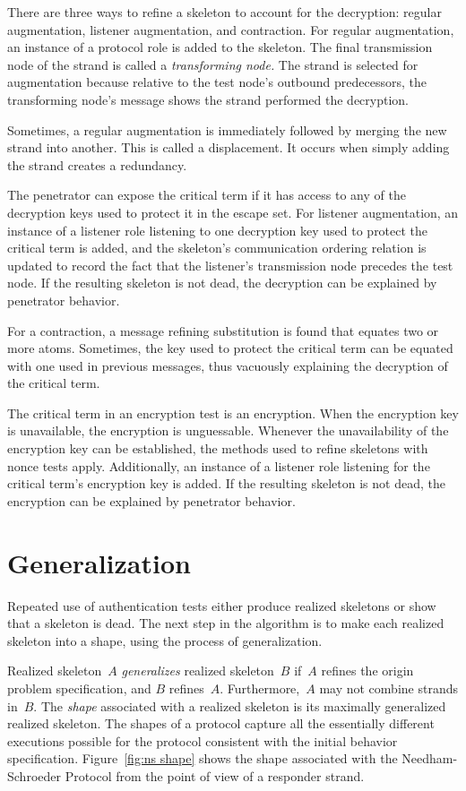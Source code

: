 \documentclass[12pt]{article}
\begin{document}
There are three ways to refine a skeleton to account for the
decryption: regular augmentation, listener augmentation, and
contraction.  For regular augmentation, an instance of a protocol role
is added to the skeleton.  The final transmission node of the strand
is called a \emph{transforming node.}  The strand is selected for
augmentation because relative to the test node's outbound
predecessors, the transforming node's message shows the strand
performed the decryption.

Sometimes, a regular augmentation is immediately followed by merging
the new strand into another.  This is called a displacement.  It
occurs when simply adding the strand creates a redundancy.

The penetrator can expose the critical term if it has access to any
of the decryption keys used to protect it in the escape set.  For
listener augmentation, an instance of a listener role listening to one
decryption key used to protect the critical term is added, and the
skeleton's communication ordering relation is updated to record the
fact that the listener's transmission node precedes the test node.  If
the resulting skeleton is not dead, the decryption can be explained by
penetrator behavior.

For a contraction, a message refining substitution is found that
equates two or more atoms.  Sometimes, the key used to protect the
critical term can be equated with one used in previous messages,
thus vacuously explaining the decryption of the critical term.

The critical term in an encryption test is an encryption.  When the
encryption key is unavailable, the encryption is unguessable.
Whenever the unavailability of the encryption key can be established,
the methods used to refine skeletons with nonce tests apply.
Additionally, an instance of a listener role listening for the
critical term's encryption key is added.  If the resulting skeleton
is not dead, the encryption can be explained by penetrator behavior.

\section{Generalization}

Repeated use of authentication tests either produce realized skeletons
or show that a skeleton is dead.  The next step in the algorithm is to
make each realized skeleton into a shape, using the process of
generalization.

Realized skeleton~$A$ \emph{generalizes}
realized skeleton~$B$ if~$A$ refines the origin problem specification,
and $B$ refines~$A$.  Furthermore,~$A$ may not combine strands in~$B$.
The \emph{shape} associated with a realized skeleton is
its maximally generalized realized skeleton.  The shapes of a protocol
capture all the essentially different executions possible for the
protocol consistent with the initial behavior specification.
Figure~\ref{fig:ns shape} shows the shape associated with the
Needham-Schroeder Protocol from the point of view of a responder
strand.
\end{document}
